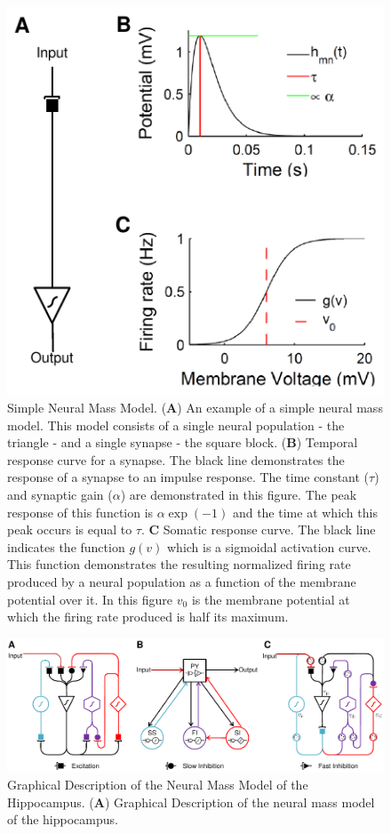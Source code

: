 \documentclass{article}%
\begin{document}
\begin{figure}
	\centering
		\includegraphics{Biological_Response.pdf}
	\caption{Simple Neural Mass Model. (\textbf{A}) An example of a simple neural mass model. This model consists of a single neural population - the triangle - and a single synapse - the square block. (\textbf{B}) Temporal response curve for a synapse. The black line demonstrates the response of a synapse to an impulse response. The time constant ($\tau$) and synaptic gain ($\alpha$) are demonstrated in this figure. The peak response of this function is $\alpha \exp(-1)$ and the time at which this peak occurs is equal to $\tau$. \textbf{C} Somatic response curve. The black line indicates the function $g(v)$ which is a sigmoidal activation curve. This function demonstrates the resulting normalized firing rate produced by a neural population as a function of the membrane potential over it. In this figure $v_{0}$ is the membrane potential at which the firing rate produced is half its maximum.}
	\label{fig: Simple}
\end{figure}

 \begin{figure}
 	\centering
 		\includegraphics{fig/Biological_Model.pdf}
 	\caption{Graphical Description of the Neural Mass Model of the Hippocampus. (\textbf{A}) Graphical Description of the neural mass model of the hippocampus. }
 	\label{fig: Biological}
 \end{figure}
\end{document}

